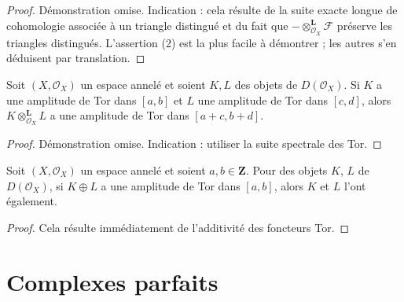 {\begin{lemma}
\begin{enumerate}
\end{enumerate}

\end{lemma}

\begin{proof}

Démonstration omise. Indication : cela résulte de la suite exacte longue de cohomologie associée à un triangle distingué et du fait que
$- \otimes_{\mathcal{O}_X}^{\mathbf{L}} \mathcal{F}$
préserve les triangles distingués. L'assertion (2) est la plus facile à démontrer ; les autres s'en déduisent par translation.

\end{proof}

\begin{lemma}

\label{lemma-tensor-tor-amplitude}
Soit $(X, \mathcal{O}_X)$ un espace annelé et soient $K, L$ des objets de $D(\mathcal{O}_X)$. Si $K$ a une amplitude de Tor dans $[a, b]$ et $L$ une amplitude de Tor dans $[c, d]$, alors $K \otimes_{\mathcal{O}_X}^\mathbf{L} L$ a une amplitude de Tor dans $[a + c, b + d]$.
\end{lemma}

\begin{proof}

Démonstration omise. Indication : utiliser la suite spectrale des Tor.

\end{proof}

\begin{lemma}

\label{lemma-summands-tor-amplitude}
Soit $(X, \mathcal{O}_X)$ un espace annelé et soient $a, b \in \mathbf{Z}$. Pour des objets $K$, $L$ de $D(\mathcal{O}_X)$, si $K \oplus L$ a une amplitude de Tor dans $[a, b]$, alors $K$ et $L$ l'ont également.
\end{lemma}

\begin{proof}

Cela résulte immédiatement de l'additivité des foncteurs Tor.

\end{proof}





\section{Complexes parfaits}

\label{section-perfect}

}
